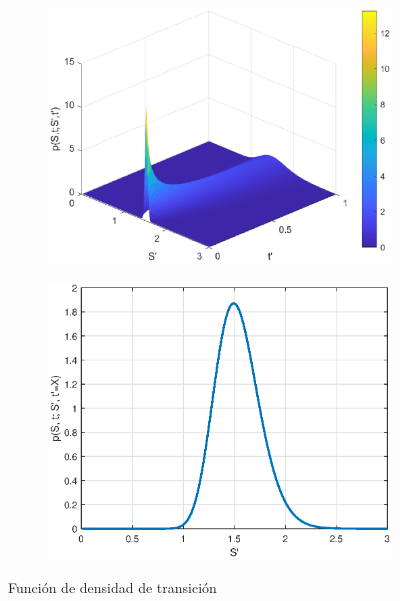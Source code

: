 \begin{figure}[H]
    \centering
    \begin{subfigure}[b]{0.45\linewidth}
        \includegraphics[width=\linewidth]{Imagenes/3_Aleatoriedad/PDF_3D.eps}
    \end{subfigure}
        \begin{subfigure}[b]{0.45\linewidth}
        \includegraphics[width=\linewidth]{Imagenes/3_Aleatoriedad/PDF_2D.eps}
    \end{subfigure}
    \caption{Función de densidad de transición}
\end{figure}



